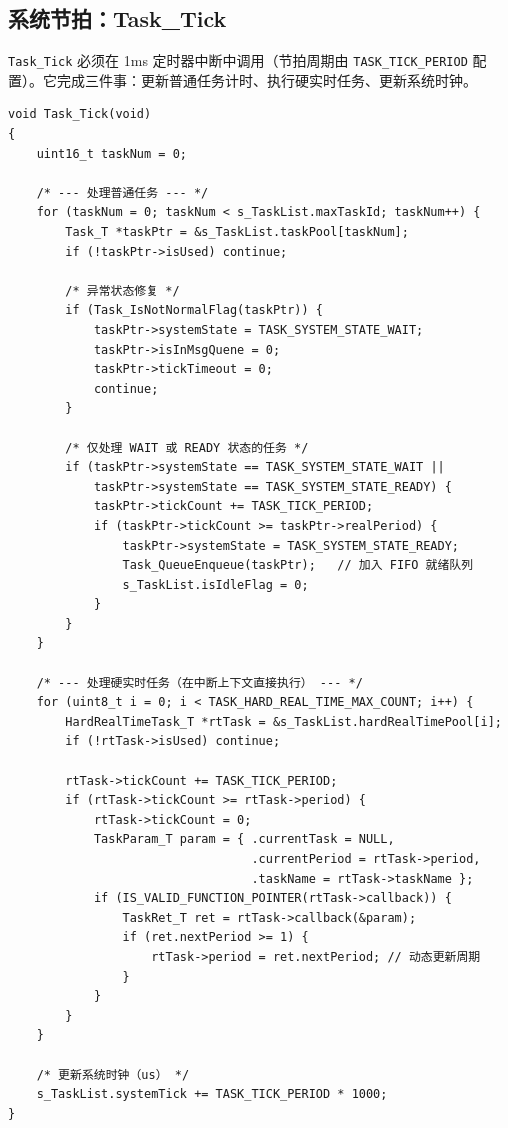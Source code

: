 \subsection{系统节拍：Task\_Tick}

\texttt{Task\_Tick} 必须在 1ms 定时器中断中调用（节拍周期由 \texttt{TASK\_TICK\_PERIOD} 配置）。它完成三件事：更新普通任务计时、执行硬实时任务、更新系统时钟。

\begin{lstlisting}[style=c]
void Task_Tick(void)
{
    uint16_t taskNum = 0;

    /* --- 处理普通任务 --- */
    for (taskNum = 0; taskNum < s_TaskList.maxTaskId; taskNum++) {
        Task_T *taskPtr = &s_TaskList.taskPool[taskNum];
        if (!taskPtr->isUsed) continue;

        /* 异常状态修复 */
        if (Task_IsNotNormalFlag(taskPtr)) {
            taskPtr->systemState = TASK_SYSTEM_STATE_WAIT;
            taskPtr->isInMsgQuene = 0;
            taskPtr->tickTimeout = 0;
            continue;
        }

        /* 仅处理 WAIT 或 READY 状态的任务 */
        if (taskPtr->systemState == TASK_SYSTEM_STATE_WAIT ||
            taskPtr->systemState == TASK_SYSTEM_STATE_READY) {
            taskPtr->tickCount += TASK_TICK_PERIOD;
            if (taskPtr->tickCount >= taskPtr->realPeriod) {
                taskPtr->systemState = TASK_SYSTEM_STATE_READY;
                Task_QueueEnqueue(taskPtr);   // 加入 FIFO 就绪队列
                s_TaskList.isIdleFlag = 0;
            }
        }
    }

    /* --- 处理硬实时任务（在中断上下文直接执行） --- */
    for (uint8_t i = 0; i < TASK_HARD_REAL_TIME_MAX_COUNT; i++) {
        HardRealTimeTask_T *rtTask = &s_TaskList.hardRealTimePool[i];
        if (!rtTask->isUsed) continue;

        rtTask->tickCount += TASK_TICK_PERIOD;
        if (rtTask->tickCount >= rtTask->period) {
            rtTask->tickCount = 0;
            TaskParam_T param = { .currentTask = NULL,
                                  .currentPeriod = rtTask->period,
                                  .taskName = rtTask->taskName };
            if (IS_VALID_FUNCTION_POINTER(rtTask->callback)) {
                TaskRet_T ret = rtTask->callback(&param);
                if (ret.nextPeriod >= 1) {
                    rtTask->period = ret.nextPeriod; // 动态更新周期
                }
            }
        }
    }

    /* 更新系统时钟（us） */
    s_TaskList.systemTick += TASK_TICK_PERIOD * 1000;
}
\end{lstlisting}


